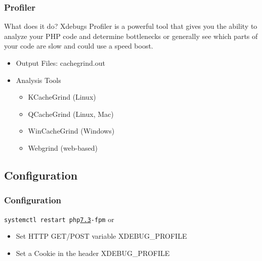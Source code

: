 \begin{frame}\frametitle{Profiler}
    \begin{block}{What does it do?}
    Xdebugs Profiler is a powerful tool that gives you the ability 
    to analyze your PHP code and determine bottlenecks or generally 
    see which parts of your code are slow and could use a speed boost.
    \end{block} \pause
    \begin{itemize}
        \item Output Files: cachegrind.out \pause
        \item Analysis Tools 
            \begin{itemize} 
            \item KCacheGrind (Linux)
            \item QCacheGrind (Linux, Mac)
            \item WinCacheGrind (Windows)
            \item Webgrind (web-based)
            \end{itemize}
    \end{itemize}
\end{frame}

\subsection{Configuration}
\begin{frame}\frametitle{Configuration}
    \texttt{systemctl restart php\underline{7.3}-fpm}
    or
    \begin{itemize}
        \item Set HTTP GET/POST variable XDEBUG\_PROFILE
        \item Set a Cookie in the header XDEBUG\_PROFILE
    \end{itemize}
\end{frame}
